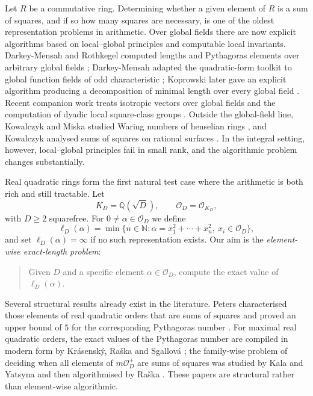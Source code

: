\documentclass[manuscript,screen]{acmart}
\renewcommand{\ge}{\geqslant}
\theoremstyle{plain}
\theoremstyle{definition}
\theoremstyle{nonitalicremark}
\newcommand{\Q}{\mathbb{Q}}
\newcommand{\OD}{\mathcal{O}_D}
\newcommand{\OO}{\mathcal{O}}
\newcommand{\len}{\ell}
\begin{document}
Let $R$ be a commutative ring. Determining whether a given element of $R$ is a sum of
squares, and if so how many squares are necessary, is one of the oldest representation problems in
arithmetic. Over global fields there are now explicit algorithms based on local--global principles
and computable local invariants. Darkey-Mensah and Rothkegel computed lengths and Pythagoras
elements over arbitrary global fields \cite{DMR}; Darkey-Mensah adapted the quadratic-form
toolkit to global function fields of odd characteristic \cite{DMGF}; Koprowski later gave an
explicit algorithm producing a decomposition of minimal length over every global field \cite{Kop}.
Recent companion work treats isotropic vectors over global fields and the computation of dyadic
local square-class groups \cite{KopIso,KopDyadic}. Outside the global-field line, Kowalczyk and
Miska studied Waring numbers of henselian rings \cite{KMHenselian}, and Kowalczyk analysed sums
of squares on rational surfaces \cite{KowSurf}. In the integral setting, however, local--global
principles fail in small rank, and the algorithmic problem changes substantially.

Real quadratic rings form the first natural test case where the arithmetic is both rich and still
tractable. Let
\[
K_D = \Q(\sqrt{D}), \qquad \OD = \OO_{K_D},
\]
with $D \ge 2$ squarefree. For $0 \neq \alpha \in \OD$ we define
\[
\len_D(\alpha) = \min\bigl\{n \in \mathbb{N} : \alpha = x_1^2 + \cdots + x_n^2,\ x_i \in \OD\bigr\},
\]
and set $\len_D(\alpha)=\infty$ if no such representation exists. Our aim is the
\emph{element-wise exact-length problem}:
\begin{quote}
Given $D$ and a specific element $\alpha \in \OD$, compute the exact value of
$\len_D(\alpha)$.
\end{quote}

Several structural results already exist in the literature. Peters characterised those elements of
real quadratic orders that are sums of squares and proved an upper bound of $5$ for the
corresponding Pythagoras number \cite{PetersActa,PetersCrelle}. For maximal real quadratic
orders, the exact values of the Pythagoras number are compiled in modern form by Kr\'asensk\'y,
Ra\v ska and Sgallov\'a \cite[Theorem~3.1]{KRS}; the family-wise problem of deciding when all
elements of $m\OD^+$ are sums of squares was studied by Kala and Yatsyna and then algorithmised
by Ra\v ska \cite{KY,Raska}. These papers are structural rather than element-wise algorithmic.
\end{document}
